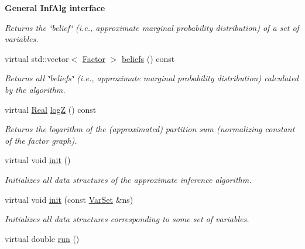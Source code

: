 \begin{Indent}{\bf General InfAlg interface}
\begin{CompactItemize}
\begin{CompactList}\small\item\em Returns the \char`\"{}belief\char`\"{} (i.e., approximate marginal probability distribution) of a set of variables. \item\end{CompactList}\item 
\hypertarget{classdai_1_1BP_9abc95e4018fa099278fcdbf8a7941b4}{
virtual std::vector$<$ \hyperlink{classdai_1_1TFactor}{Factor} $>$ \hyperlink{classdai_1_1BP_9abc95e4018fa099278fcdbf8a7941b4}{beliefs} () const }
\label{classdai_1_1BP_9abc95e4018fa099278fcdbf8a7941b4}

\begin{CompactList}\small\item\em Returns all \char`\"{}beliefs\char`\"{} (i.e., approximate marginal probability distribution) calculated by the algorithm. \item\end{CompactList}\item 
\hypertarget{classdai_1_1BP_ed06ca9607cb04cfeb05909366d179ce}{
virtual \hyperlink{namespacedai_e7d0472fdc89a8635825d01940e91cbf}{Real} \hyperlink{classdai_1_1BP_ed06ca9607cb04cfeb05909366d179ce}{logZ} () const }
\label{classdai_1_1BP_ed06ca9607cb04cfeb05909366d179ce}

\begin{CompactList}\small\item\em Returns the logarithm of the (approximated) partition sum (normalizing constant of the factor graph). \item\end{CompactList}\item 
virtual void \hyperlink{classdai_1_1BP_83349319b22a2d71b1f4ef39709365f9}{init} ()
\begin{CompactList}\small\item\em Initializes all data structures of the approximate inference algorithm. \item\end{CompactList}\item 
virtual void \hyperlink{classdai_1_1BP_b711dcd5db848b6d993fac482b64ee20}{init} (const \hyperlink{classdai_1_1VarSet}{VarSet} \&ns)
\begin{CompactList}\small\item\em Initializes all data structures corresponding to some set of variables. \item\end{CompactList}\item 
\hypertarget{classdai_1_1BP_65e6e4e56d227a17d086c5fc8931d3ff}{
virtual double \hyperlink{classdai_1_1BP_65e6e4e56d227a17d086c5fc8931d3ff}{run} ()}
\label{classdai_1_1BP_65e6e4e56d227a17d086c5fc8931d3ff}


\end{CompactItemize}
\end{Indent}
